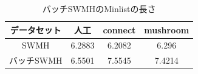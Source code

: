      
\begin{table}[h]
        \caption{バッチSWMHのMinlistの長さ}
          \label{tab:jikken4_2}
           \centering
  \begin{tabular}{|c| |c|c|c|}
   \hline
    データセット & 人工 & connect & mushroom\\
   \hline \hline
   SWMH & 6.2883 & 6.2082 & 6.296\\
   \hline
   バッチSWMH & 6.5501 & 7.5545 & 7.4214 \\
   \hline
    \end{tabular}
  \end{table}






